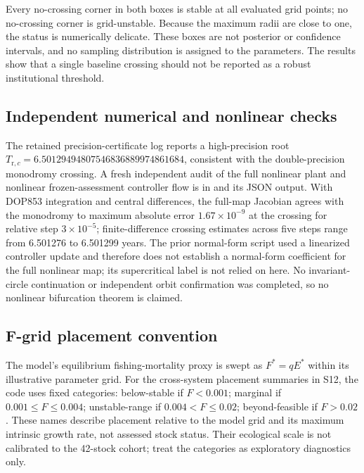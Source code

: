 Every no-crossing corner in both boxes is stable at all evaluated grid points; no no-crossing corner is grid-unstable. Because the maximum radii are close to one, the status is numerically delicate. These boxes are not posterior or confidence intervals, and no sampling distribution is assigned to the parameters. The results show that a single baseline crossing should not be reported as a robust institutional threshold.

\subsection{Independent numerical and nonlinear checks}

The retained precision-certificate log reports a high-precision root \(T_{\mathrm r,c}=6.50129494807546836889974861684\), consistent with the double-precision monodromy crossing. A fresh independent audit of the full nonlinear plant and nonlinear frozen-assessment controller flow is in \texttt{} and its JSON output. With DOP853 integration and central differences, the full-map Jacobian agrees with the monodromy to maximum absolute error \(1.67\times10^{-9}\) at the crossing for relative step \(3\times10^{-5}\); finite-difference crossing estimates across five steps range from 6.501276 to 6.501299 years. The prior normal-form script used a linearized controller update and therefore does not establish a normal-form coefficient for the full nonlinear map; its supercritical label is not relied on here. No invariant-circle continuation or independent orbit confirmation was completed, so no nonlinear bifurcation theorem is claimed.

\subsection{F-grid placement convention}

The model's equilibrium fishing-mortality proxy is swept as \(F^*=qE^*\) within its illustrative parameter grid. For the cross-system placement summaries in S12, the code uses fixed categories: below-stable if \(F<0.001\); marginal if \(0.001\leq F\leq0.004\); unstable-range if \(0.004<F\leq0.02\); beyond-feasible if \(F>0.02\). These names describe placement relative to the model grid and its maximum intrinsic growth rate, not assessed stock status. Their ecological scale is not calibrated to the 42-stock cohort; treat the categories as exploratory diagnostics only.

